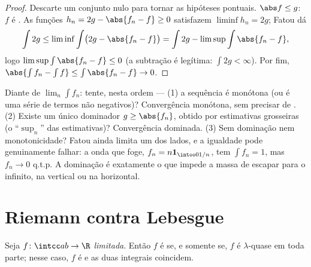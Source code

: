 \begin{proof}
Descarte um conjunto nulo para tornar as hipóteses pontuais. $\abs f
\leq g$:
$f$ é . As funções $h_n = 2g - \abs{f_n
- f} \geq 0$ satisfazem $\liminf h_n = 2g$; Fatou dá
\[
\int 2g \leq \liminf\int\bigl(2g - \abs{f_n - f}\bigr)
= \int 2g - \limsup\int\abs{f_n - f},
\]
logo $\limsup\int\abs{f_n - f} \leq 0$ (a subtração é legítima: $\int 2g < \infty$). Por fim, $\abs{\int f_n - \int f} \leq
\int\abs{f_n - f} \to 0$.
\end{proof}

\begin{method}\label{met:b3:lebesgue:convergence}
Diante de $\lim_n\int f_n$: tente, nesta ordem --- (1) a sequência é monótona (ou
é uma série de termos não negativos)? Convergência monótona, sem
precisar de . (2) Existe um único dominador 
$g \geq \abs{f_n}$, obtido por estimativas grosseiras (o ``$\sup_n$'' das
estimativas)? Convergência dominada. (3) Sem dominação nem
monotonicidade? Fatou ainda limita um dos lados, e a igualdade pode
genuinamente falhar: a onda que foge, $f_n = n\mathbf
1_{\intoo0{1/n}}$, tem $\int f_n = 1$, mas $f_n \to 0$ q.t.p.
A dominação é exatamente o que impede a massa de escapar para o
infinito, na vertical ou na horizontal.
\end{method}

\section{Riemann contra Lebesgue}

\begin{theorem}
\label{thm:b3:lebesgue:riemann}
Seja $f \colon \intcc ab \to \R$ \emph{limitada}. Então $f$ é  se, e
somente se, $f$ é  $\lambda$-quase em toda parte; nesse caso,
$f$ é  e as duas integrais coincidem.
\end{theorem}

